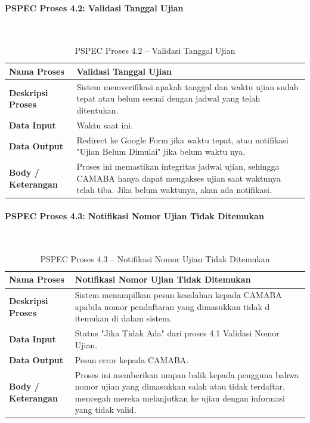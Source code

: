 \paragraph{PSPEC Proses 4.2: Validasi Tanggal Ujian}~\\
\begin{longtable}{|p{}|p{}|}
	\caption{PSPEC Proses 4.2 -- Validasi Tanggal Ujian}
	\label{table:3.pspec42}\\
	\hline
	\textbf{Nama Proses} & Validasi Tanggal Ujian \\
	\hline
	\textbf{Deskripsi Proses} & Sistem memverifikasi apakah tanggal dan waktu ujian sudah tepat atau belum sesuai dengan jadwal yang telah ditentukan. \\
	\hline
	\textbf{Data Input} & Waktu saat ini. \\
	\hline
	\textbf{Data Output} & Redirect ke Google Form jika waktu tepat, atau notifikasi "Ujian Belum Dimulai" jika belum waktu nya. \\
	\hline
	\textbf{Body / Keterangan} & Proses ini memastikan integritas jadwal ujian, sehingga CAMABA hanya dapat mengakses ujian saat waktunya telah tiba. Jika belum waktunya, akan ada notifikasi. \\
	\hline
\end{longtable}

\paragraph{PSPEC Proses 4.3: Notifikasi Nomor Ujian Tidak Ditemukan}~\\
\begin{longtable}{|p{}|p{}|}
	\caption{PSPEC Proses 4.3 -- Notifikasi Nomor Ujian Tidak Ditemukan}
	\label{table:3.pspec43}\\
	\hline
	\textbf{Nama Proses} & Notifikasi Nomor Ujian Tidak Ditemukan \\
	\hline
	\textbf{Deskripsi Proses} & Sistem menampilkan pesan kesalahan kepada CAMABA apabila nomor pendaftaran yang dimasukkan tidak d itemukan di dalam sistem. \\
	\hline
	\textbf{Data Input} & Status "Jika Tidak Ada" dari proses 4.1 Validasi Nomor Ujian. \\
	\hline
	\textbf{Data Output} & Pesan error kepada CAMABA. \\
	\hline
	\textbf{Body / Keterangan} & Proses ini memberikan umpan balik kepada pengguna bahwa nomor ujian yang dimasukkan salah atau tidak terdaftar, mencegah mereka melanjutkan ke ujian dengan informasi yang tidak valid. \\
	\hline
\end{longtable}

